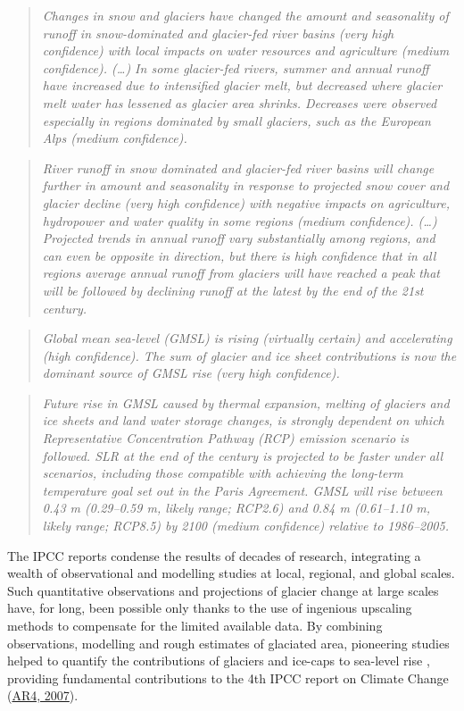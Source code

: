 \begin{quote}
\textit{Changes in snow and glaciers have changed the amount and seasonality of runoff in snow-dominated and glacier-fed river basins (very high confidence) with local impacts on water resources and agriculture (medium confidence). (…) In some glacier-fed rivers, summer and annual runoff have increased due to intensified glacier melt, but decreased where glacier melt water has lessened as glacier area shrinks. Decreases were observed especially in regions dominated by small glaciers, such as the European Alps (medium confidence).}
\end{quote}

\begin{quote}
\textit{River runoff in snow dominated and glacier-fed river basins will change further in amount and seasonality in response to projected snow cover and glacier decline (very high confidence) with negative impacts on agriculture, hydropower and water quality in some regions (medium confidence). (…) Projected trends in annual runoff vary substantially among regions, and can even be opposite in direction, but there is high confidence that in all regions average annual runoff from glaciers will have reached a peak that will be followed by declining runoff at the latest by the end of the 21st century.}
\end{quote}

\begin{quote}
\textit{Global mean sea-level (GMSL) is rising (virtually certain) and accelerating (high confidence). The sum of glacier and ice sheet contributions is now the dominant source of GMSL rise (very high confidence).}
\end{quote}

\begin{quote}
\textit{Future rise in GMSL caused by thermal expansion, melting of glaciers and ice sheets and land water storage changes, is strongly dependent on which Representative Concentration Pathway (RCP) emission scenario is followed. SLR at the end of the century is projected to be faster under all scenarios, including those compatible with achieving the long-term temperature goal set out in the Paris Agreement. GMSL will rise between 0.43 m (0.29--0.59 m, likely range; RCP2.6) and 0.84 m (0.61--1.10 m, likely range; RCP8.5) by 2100 (medium confidence) relative to 1986--2005.}
\end{quote}

The IPCC reports condense the results of decades of research, integrating a wealth of observational and modelling
studies at local, regional, and global scales. Such quantitative observations and projections of glacier change at large
scales have, for long, been possible only thanks to the use of ingenious upscaling methods to compensate for the limited
available data. By combining observations, modelling and rough estimates of glaciated area, pioneering studies helped to
quantify the contributions of glaciers and ice-caps to sea-level rise
\citep{Gregory1998,Raper2000,Wal2001,Braithwaite2002,Kaser2006a,Raper2006a,Meier2007,Cogley2009,Bahr2009}, providing
fundamental contributions to the 4th IPCC report on Climate Change (\href{https://www.ipcc.ch/report/ar4/wg1/}{AR4, 2007}).

